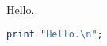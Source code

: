 \documentclass{article}
\begin{document}
Hello.
\begin{lstlisting}[language=Perl]
print "Hello.\n";


\end{lstlisting}
\end{document}
